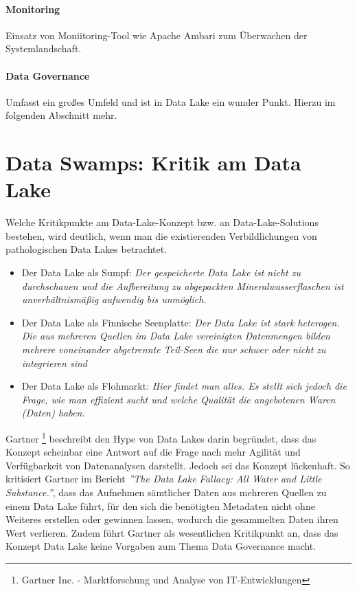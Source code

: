\documentclass[twoside,twocolumn]{article}
\begin{document}
\paragraph{Monitoring}
		Einsatz von Moniitoring-Tool wie Apache Ambari zum Überwachen der Systemlandschaft.\cite{src8}
\paragraph{Data Governance}
		Umfasst ein großes Umfeld und ist in Data Lake ein wunder Punkt. Hierzu im folgenden Abschnitt mehr.


\section{Data Swamps: Kritik am Data Lake}
Welche Kritikpunkte am Data-Lake-Konzept bzw. an Data-Lake-Solutions bestehen, wird deutlich, wenn man die existierenden Verbildlichungen von pathologischen Data Lakes betrachtet.
\begin{itemize}
	\item Der Data Lake als Sumpf: \textit{Der gespeicherte Data Lake ist nicht zu durchschauen und die Aufbereitung zu abgepackten Mineralwasserflaschen ist unverhältnismäßig aufwendig bis unmöglich.\cite{src3}}
	\item Der Data Lake als Finnische Seenplatte:  \textit{Der Data Lake ist stark heterogen. Die aus mehreren Quellen im Data Lake vereinigten Datenmengen bilden mehrere voneinander abgetrennte Teil-Seen die nur schwer oder nicht zu integrieren sind\cite{src13}} 
	\item Der Data Lake als Flohmarkt: \textit{Hier findet man alles. Es stellt sich jedoch die Frage, wie man effizient sucht und welche Qualität die angebotenen Waren (Daten) haben.\cite{src12}} 
\end{itemize}

Gartner \footnote{Gartner Inc. - Marktforschung und Analyse von IT-Entwicklungen} beschreibt den Hype von Data Lakes darin begründet, dass das Konzept scheinbar eine Antwort auf die Frage nach mehr Agilität und Verfügbarkeit von Datenanalysen darstellt. Jedoch sei das Konzept lückenhaft. So kritisiert Gartner im Bericht \textit{''The Data Lake Fallacy: All Water and Little Substance.''}, dass das Aufnehmen sämtlicher Daten aus mehreren Quellen zu einem Data Lake führt, für den sich die benötigten Metadaten nicht ohne Weiteres erstellen oder gewinnen lassen, wodurch die gesammelten Daten ihren Wert verlieren. Zudem führt Gartner als wesentlichen Kritikpunkt an, dass das Konzept Data Lake keine Vorgaben zum Thema Data Governance macht.\cite{src3}
\end{document}
